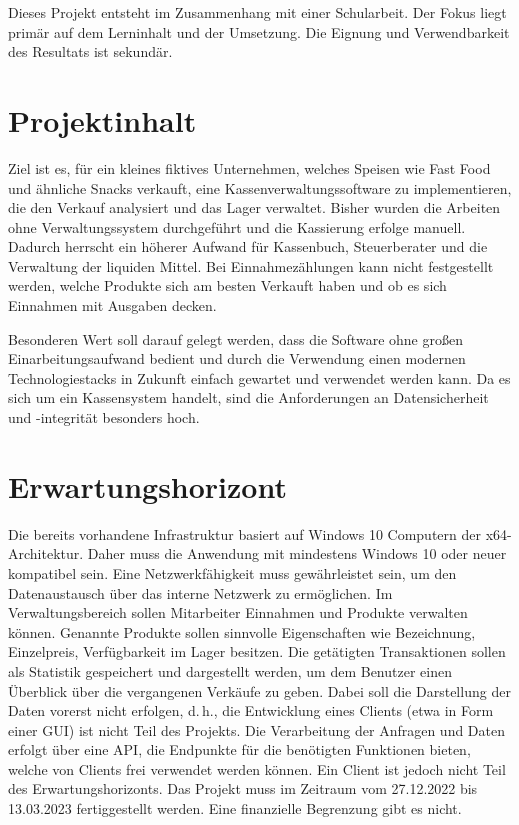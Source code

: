 Dieses Projekt entsteht im Zusammenhang mit einer Schularbeit. Der Fokus liegt primär auf dem Lerninhalt und der Umsetzung. Die Eignung und Verwendbarkeit des Resultats ist sekundär.

\section{Projektinhalt}
Ziel ist es, für ein kleines fiktives Unternehmen, welches Speisen wie Fast Food und ähnliche Snacks verkauft, eine Kassenverwaltungssoftware zu implementieren, die den Verkauf analysiert und das Lager verwaltet.
Bisher wurden die Arbeiten ohne Verwaltungssystem durchgeführt und die Kassierung erfolge manuell.
Dadurch herrscht ein höherer Aufwand für Kassenbuch, Steuerberater und die Verwaltung der liquiden Mittel.
Bei Einnahmezählungen kann nicht festgestellt werden, welche Produkte sich am besten Verkauft haben und ob es sich Einnahmen mit Ausgaben decken.

Besonderen Wert soll darauf gelegt werden, dass die Software ohne großen Einarbeitungsaufwand bedient und durch die Verwendung einen modernen Technologiestacks in Zukunft einfach gewartet und verwendet werden kann.
Da es sich um ein Kassensystem handelt, sind die Anforderungen an Datensicherheit und -integrität besonders hoch.

\section{Erwartungshorizont}
Die bereits vorhandene Infrastruktur basiert auf Windows 10 Computern der x64-Architektur.
Daher muss die Anwendung mit mindestens Windows 10 oder neuer kompatibel sein.
Eine Netzwerkfähigkeit muss gewährleistet sein, um den Datenaustausch über das interne Netzwerk zu ermöglichen.
Im Verwaltungsbereich sollen Mitarbeiter Einnahmen und Produkte verwalten können.
Genannte Produkte sollen sinnvolle Eigenschaften wie Bezeichnung, Einzelpreis, Verfügbarkeit im Lager besitzen.
Die getätigten Transaktionen sollen als Statistik gespeichert und dargestellt werden, um dem Benutzer einen Überblick über die vergangenen Verkäufe zu geben.
Dabei soll die Darstellung der Daten vorerst nicht erfolgen, d.\,h., die Entwicklung eines Clients (etwa in Form einer GUI) ist nicht Teil des Projekts.
Die Verarbeitung der Anfragen und Daten erfolgt über eine API, die Endpunkte für die benötigten Funktionen bieten, welche von Clients frei verwendet werden können.
Ein Client ist jedoch nicht Teil des Erwartungshorizonts.
Das Projekt muss im Zeitraum vom 27.12.2022 bis 13.03.2023 fertiggestellt werden.
Eine finanzielle Begrenzung gibt es nicht.

